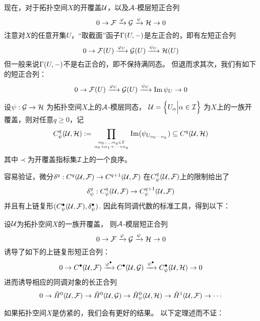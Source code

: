 现在，对于拓扑空间$X$的开覆盖$\mathcal{U}$，以及$\mathcal{A}$-模层短正合列
$$0\to\mathcal{F}\xrightarrow{\varphi}\mathcal{G}\xrightarrow{\psi}\mathcal{H}\to 0$$
注意对$X$的任意开集$U$，“取截面”函子$\Gamma(U,-)$是左正合的，即有左短正合列
$$
  0\to\mathcal{F}(U)\xrightarrow{\varphi_U}
  \mathcal{G}(U)\xrightarrow{\psi_U}
  \mathcal{H}(U)
$$
但一般来说$\Gamma(U,-)$不是右正合的，即不保持满同态。
但退而求其次，我们有如下的短正合列：
$$
  0\to\mathcal{F}(U)\xrightarrow{\varphi_U}
  \mathcal{G}(U)\xrightarrow{\psi_U}
  \operatorname{Im}\psi_U\to 0
$$

\begin{notation}
设$\psi:\mathcal{G}\to\mathcal{H}$
为拓扑空间$X$上的$\mathcal{A}$-模层同态，
$\mathcal{U}=\Big\{ U_\alpha \Big| \alpha\in\mathcal{I} \Big\}$
为$X$上的一族开覆盖，则对任意$q\geq 0$，记
$$
  C_\psi^q(\mathcal{U},\mathcal{H})
:=
  \prod_{\alpha_0,...,\alpha_q\in\mathcal{I}
         \atop\alpha_0\prec\alpha_1\prec\cdots\prec\alpha_q}
    \operatorname{Im}(\psi_{U_{\alpha_0\cdots\alpha_k}})
\subseteq
  C^q(\mathcal{U},\mathcal{H})
$$
其中$\prec$为开覆盖指标集$\mathcal{I}$上的一个良序。
\end{notation}
容易验证，\Cech 微分$\delta^q:C^q(\mathcal{U},\mathcal{F})
\to C^{q+1}(\mathcal{U},\mathcal{F})$
在$C^q_\psi(\mathcal{U},\mathcal{F})$上的限制给出了
$$
  \delta_\psi^q:
  C^q_\psi(\mathcal{U},\mathcal{F})
  \to C^{q+1}_\psi(\mathcal{U},\mathcal{F})
$$
并且有上链复形$(C^{\bullet}_\psi(\mathcal{U},\mathcal{F}),\delta^{\bullet}_\psi)$.
因此有同调代数的标准工具，得到以下：


\begin{prop}设$\mathcal{U}$为拓扑空间$X$的一族开覆盖，
则$\mathcal{A}$-模层短正合列
$$0\to\mathcal{F}\xrightarrow{\varphi}\mathcal{G}\xrightarrow{\psi}\mathcal{H}\to 0$$
诱导了如下的上链复形短正合列：
$$
  0\to C^{\bullet}(\mathcal{U},\mathcal{F})
  \xrightarrow{\varphi^{\bullet}}
  C^{\bullet}(\mathcal{U},\mathcal{G})
  \xrightarrow{\psi^{\bullet}}
  C_\psi^{\bullet}(\mathcal{U},\mathcal{H})
  \to 0
$$
进而诱导相应的同调对象的长正合列
$$
  0\to\check{H}^0(\mathcal{U},\mathcal{F})
  \to\check{H}^0(\mathcal{U},\mathcal{G})
  \to\check{H}^0_\psi(\mathcal{U},\mathcal{H})
  \to\check{H}^1(\mathcal{U},\mathcal{F})
  \to\cdots
$$
\end{prop}

如果拓扑空间$X$是仿紧的，我们会有更好的结果。
以下定理述而不证：

